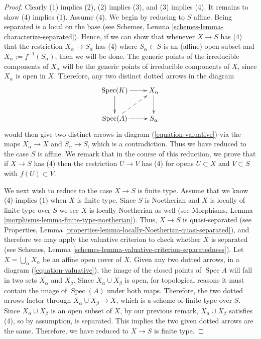 \documentclass{stacks-project}
\theoremstyle{plain}
\theoremstyle{definition}
\theoremstyle{remark}
\numberwithin{equation}{subsection}
\def\Spec{\mathop{\mathrm{Spec}}}
\begin{document}
\begin{proof}
Clearly (1) implies (2), (2) implies (3), and (3) implies (4).  It
remains to show (4) implies (1). Assume (4).
We begin by reducing to $S$ affine.  Being separated is a local
on the base (see
Schemes, Lemma \ref{schemes-lemma-characterize-separated}).
Hence, if we can show that whenever
$X \to S$ has (4) that the restriction $X_\alpha \to S_\alpha$ has (4)
where $S_\alpha \subset S$ is an (affine) open subset and $X_\alpha :=
f^{-1}(S_\alpha)$, then we will be done.  The
generic points of the irreducible components of $X_\alpha$ will be the
generic points of irreducible components of $X$, since $X_\alpha$ is
open in $X$.  Therefore, any two distinct dotted arrows in the diagram
\begin{equation}
\label{equation-valuative-alpha}
\xymatrix{
\Spec(K) \ar[r] \ar[d] & X_\alpha \ar[d] \\
\Spec(A) \ar[r] \ar@{-->}[ru] & S_\alpha
}
\end{equation}
would then give two distinct arrows in diagram
(\ref{equation-valuative}) via the maps $X_\alpha \to X$ and
$S_\alpha \to S$, which is a contradiction.  Thus we have reduced
to the case $S$ is affine.  We remark that in the course of this
reduction, we prove that if $X \to S$ has (4) then the restriction $U
\to V$ has (4) for opens $U \subset X$ and $V \subset S$ with
$f(U) \subset V$.

\medskip\noindent
We next wish to reduce to the case $X \to S$ is finite type.  Assume
that we know (4) implies (1) when $X$ is finite type. Since
$S$ is Noetherian and $X$ is locally of finite type over $S$
we see $X$ is locally Noetherian as well (see Morphisms,
Lemma \ref{morphisms-lemma-finite-type-noetherian}).
Thus, $X \to S$ is quasi-separated (see
Properties, Lemma \ref{properties-lemma-locally-Noetherian-quasi-separated}),
and therefore we may apply the valuative criterion to check whether $X$
is separated (see
Schemes, Lemma \ref{schemes-lemma-valuative-criterion-separatedness}).
Let $X = \bigcup_\alpha X_\alpha$ be an affine open
cover of $X$. Given any two dotted arrows, in a diagram
(\ref{equation-valuative}), the image of the closed points of
$\Spec A$ will
fall in two sets $X_\alpha$ and $X_\beta$.  Since $X_\alpha \cup
X_\beta$ is open, for topological reasons it must contain the image of
$\Spec(A)$ under both maps. Therefore, the two dotted arrows factor
through $X_\alpha \cup X_\beta \to X$, which is a scheme of finite type over
$S$. Since $X_\alpha \cup X_\beta$ is an open subset of $X$, by our
previous remark, $X_\alpha \cup X_\beta$ satisfies (4), so by
assumption, is separated.  This implies the two given dotted
arrows are the same. Therefore, we have reduced to $X \to S$ is finite type.


\end{proof}
\end{document}
